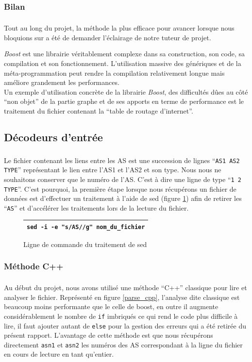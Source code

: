 \subsubsection{Bilan}
\subparagraph{}
Tout au long du projet, la méthode la plus efficace pour avancer lorsque nous bloquions sur \boost a été de demander l'éclairage de notre tuteur de projet. 

\textit{Boost} est une librairie véritablement complexe dans sa construction, son code, sa compilation et son fonctionnement. L'utilisation massive des génériques et de la méta-programmation peut rendre la compilation relativement longue mais améliore grandement les performances.
~\\
Un exemple d'utilisation  concrète de la librairie \textit{Boost}, des difficultés dûes au côté ``non objet'' de la partie graphe et de ses apports en terme de performance est le traitement du fichier contenant la ``table de routage d'internet''.

\subsection{Décodeurs d'entrée}
\subparagraph{}
Le fichier contenant les liens entre les AS est une succession de lignes ``\verb|AS1 AS2 TYPE|'' représentant le lien entre l'AS1 et l'AS2 et son type. Nous nous ne souhaitons conserver que le numéro de l'AS. C'est à dire une ligne de type ``\verb|1 2 TYPE|''. C'est pourquoi, la première étape lorsque nous récupérons un fichier de données est d'effectuer un traitement à l'aide de sed (figure \ref{sed}) afin de retirer les ``\verb|AS|'' et d'accélérer les traitements lors de la lecture du fichier. 
\begin{figure}[H]
   \begin{center}
      \begin{tabular}{l}
         \hline
         \verb|sed -i -e "s/AS//g" nom_du_fichier|\\
         \hline
      \end{tabular}
   \end{center}
\caption{\label{sed} Ligne de commande du traitement de sed}
\end{figure}

\subsubsection{Méthode C++}
\subparagraph{}
Au début du projet, nous avons utilisé une méthode ``C++'' classique pour lire et analyser le fichier. 
Représenté en figure \ref{parse_cpp}, l'analyse dite classique est beaucoup moins performante que le celle de boost, en outre il augmente considérablement le nombre de \verb|if| imbriqués ce qui rend le code plus difficile à lire, il faut ajouter autant de \verb|else| pour la gestion des erreurs qui a été retirée du présent rapport. L'avantage de cette méthode est que nous récupérons directement \verb|asn1| et \verb|asn2| les numéros des AS correspondant à la ligne du fichier en cours de lecture en tant qu'entier.

